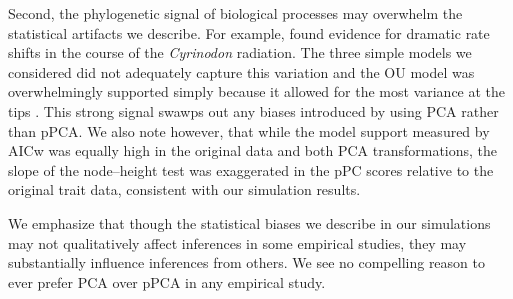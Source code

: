 \documentclass[a4paper,12pt]{article}
\begin{document}
Second, the phylogenetic signal of biological processes may overwhelm the statistical artifacts we describe. For example, \citet{Martin2011} found evidence for dramatic rate shifts in the course of the \emph{Cyrinodon} radiation. The three simple models we considered did not adequately capture this variation and the OU model was overwhelmingly supported simply because it allowed for the most variance at the tips \citep{Pennell-adequacy}. This strong signal swawps out any biases introduced by using PCA rather than pPCA. We also note however, that while the model support measured by AICw was equally high in the original data and both PCA transformations, the slope of the node--height test was exaggerated in the pPC scores relative to the original trait data, consistent with our simulation results.

We emphasize that though the statistical biases we describe in our simulations may not qualitatively affect inferences in some empirical studies, they may substantially influence inferences from others. We see no compelling reason to ever prefer PCA over pPCA in any empirical study.  
\end{document}
